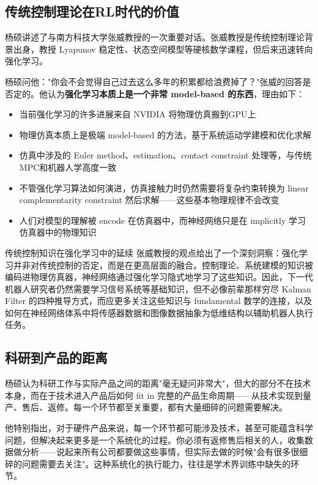 \subsection{传统控制理论在RL时代的价值}

杨硕讲述了与南方科技大学张威教授的一次重要对话。张威教授是传统控制理论背景出身，教授 Lyapunov 稳定性、状态空间模型等硬核数学课程，但后来迅速转向强化学习。

杨硕问他："你会不会觉得自己过去这么多年的积累都给浪费掉了？"张威的回答是否定的。他认为\textbf{强化学习本质上是一个非常 model-based 的东西}，理由如下：

\begin{itemize}
    \item 当前强化学习的许多进展来自 NVIDIA 将物理仿真搬到GPU上
    \item 物理仿真本质上是极端 model-based 的方法，基于系统运动学建模和优化求解
    \item 仿真中涉及的 Euler method、estimation、contact constraint 处理等，与传统MPC和机器人学高度一致
    \item 不管强化学习算法如何演进，仿真接触力时仍然需要将复杂约束转换为 linear complementarity constraint 然后求解——这些基本物理规律不会改变
    \item 人们对模型的理解被 encode 在仿真器中，而神经网络只是在 implicitly 学习仿真器中的物理知识
\end{itemize}

\begin{importantbox}{传统控制知识在强化学习中的延续}
张威教授的观点给出了一个深刻洞察：强化学习并非对传统控制的否定，而是在更高层面的融合。控制理论、系统建模的知识被编码进物理仿真器，神经网络通过强化学习隐式地学习了这些知识。因此，下一代机器人研究者仍然需要学习信号系统等基础知识，但不必像前辈那样穷尽 Kalman Filter 的四种推导方式，而应更多关注这些知识与 fundamental 数学的连接，以及如何在神经网络体系中将传感器数据和图像数据抽象为低维结构以辅助机器人执行任务。
\end{importantbox}

\subsection{科研到产品的距离}

杨硕认为科研工作与实际产品之间的距离"毫无疑问非常大"，但大的部分不在技术本身，而在于技术进入产品后如何 fit in 完整的产品生命周期——从技术实现到量产、售后、返修。每一个环节都至关重要，都有大量细碎的问题需要解决。

他特别指出，对于硬件产品来说，每一个环节都可能涉及技术，甚至可能蕴含科学问题，但解决起来更多是一个系统化的过程。你必须有返修售后相关的人，收集数据做分析——说起来所有公司都要做这些事情，但实际去做的时候"会有很多很细碎的问题需要去关注"。这种系统化的执行能力，往往是学术界训练中缺失的环节。

